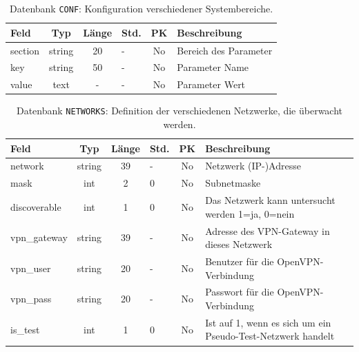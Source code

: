 \begin{table}[H]
\centering
\begin{tabular}{l|c|c|l|c|p{8cm}}
 \toprule
 Feld & Typ & L\"ange & Std. & PK & Beschreibung\\
 \midrule
 section & string & 20 & - & No & Bereich des Parameter\\
 \midrule
 key & string & 50 & - & No & Parameter Name\\
 \midrule
 value & text & - & - & No & Parameter Wert\\
 \bottomrule
\end{tabular}
\caption[Datenbank-Tabelle: CONF]{Datenbank \texttt{CONF}: Konfiguration verschiedener Systembereiche.}
\label{tbl:praxis-basis-data-table_conf}
\end{table}

\begin{table}[H]
\centering
\begin{tabular}{l|c|c|l|c|p{7cm}}
 \toprule
 Feld & Typ & L\"ange & Std. & PK & Beschreibung\\
 \midrule
 network & string & 39 & - & No & Netzwerk (IP-)Adresse\\
 \midrule
 mask & int & 2 & 0 & No & Subnetmaske\\
 \midrule
 discoverable & int & 1 & 0 & No & Das Netzwerk kann untersucht werden 1=ja, 0=nein\\
 \midrule
 vpn\_gateway & string & 39 & - & No & Adresse des VPN-Gateway in dieses Netzwerk\\
 \midrule
 vpn\_user & string & 20 & - & No & Benutzer f\"ur die OpenVPN-Verbindung\\
 \midrule
 vpn\_pass & string & 20 & - & No & Passwort f\"ur die OpenVPN-Verbindung\\
 \midrule
 is\_test & int & 1 & 0 & No & Ist auf 1, wenn es sich um ein Pseudo-Test-Netzwerk handelt\\
 \bottomrule
\end{tabular}
\caption[Datenbank-Tabelle: NETWORKS]{Datenbank \texttt{NETWORKS}: Definition der verschiedenen Netzwerke, die \"uberwacht werden.}
\label{tbl:praxis-basis-data-table_netw}
\end{table}

